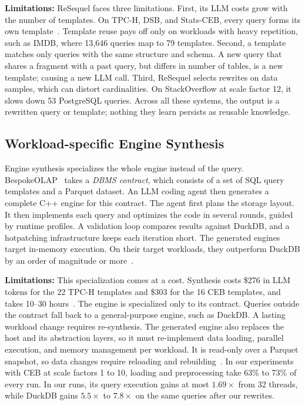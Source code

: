 \textbf{Limitations:} ReSequel faces three limitations.
First, its LLM costs grow with the number of templates.
On TPC-H, DSB, and Stats-CEB, every query forms its own template~\cite{resequel}.
Template reuse pays off only on workloads with heavy repetition, such as IMDB, where 13,646 queries map to 79 templates.
Second, a template matches only queries with the same structure and schema.
A new query that shares a fragment with a past query, but differs in number of tables, is a new template; causing a new LLM call.
Third, ReSequel selects rewrites on data samples, which can distort cardinalities.
On StackOverflow at scale factor 12, it slows down 53 PostgreSQL queries.
Across all these systems, the output is a rewritten query or template; nothing they learn persists as reusable knowledge.

\vspace{-0.15cm}
\subsection{Workload-specific Engine Synthesis}
\label{sec:bg_synthesis}
Engine synthesis specializes the whole engine instead of the query.
BespokeOLAP~\cite{bespokeolap} takes a \emph{DBMS contract}, which consists of a set of SQL query templates and a Parquet dataset.
An LLM coding agent then generates a complete C++ engine for this contract.
The agent first plans the storage layout.
It then implements each query and optimizes the code in several rounds, guided by runtime profiles.
A validation loop compares results against DuckDB, and a hotpatching infrastructure keeps each iteration short.
The generated engines target in-memory execution.
On their target workloads, they outperform DuckDB by an order of magnitude or more~\cite{bespokeolap}.

\textbf{Limitations:} This specialization comes at a cost.
Synthesis costs \$276 in LLM tokens for the 22 TPC-H templates and \$303 for the 16 CEB templates, and takes 10--30 hours~\cite{bespokeolap}.
The engine is specialized only to its contract.
Queries outside the contract fall back to a general-purpose engine, such as DuckDB.
A lasting workload change requires re-synthesis.
The generated engine also replaces the host and its abstraction layers, so it must re-implement data loading, parallel execution, and memory management per workload.
It is read-only over a Parquet snapshot, so data changes require reloading and rebuilding~\cite{bespokeolap}.
In our experiments with CEB at scale factors 1 to 10, loading and preprocessing take 63\% to 73\% of every run.
In our runs, its query execution gains at most $1.69\times$ from 32 threads, while DuckDB gains $5.5\times$ to $7.8\times$ on the same queries after our rewrites.

